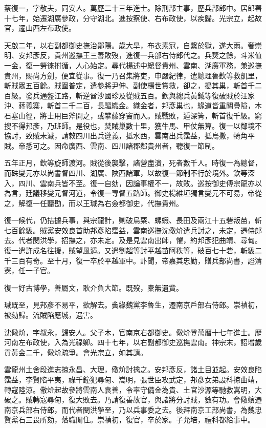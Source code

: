 \begin{pinyinscope}
{{蔡復一，字敬夫，同安人。萬歷二十三年進士。除刑部主事，歷兵部郎中。居郎署十七年，始遷湖廣參政，分守湖北。進按察使、右布政使，以疾歸。光宗立，起故官，遷山西左布政使。

天啟二年，以右副都御史撫治鄖陽。歲大旱，布衣素冠，自繫於獄，遂大雨。奢崇明、安邦彥反，貴州巡撫王三善敗歿，進復一兵部右侍郎代之。兵燹之餘，斗米值一金，復一勞徠拊循，人心始定。尋代楊述中總督貴州、雲南、湖廣軍務，兼巡撫貴州，賜尚方劍，便宜從事。復一乃召集將吏，申嚴紀律，遣總理魯欽等救凱里，斬賊眾五百餘。賊圍普定，遣參將尹伸、副使楊世賞救，卻之，搗其巢，斬首千二百級。發兵通盤江路，斬逆酋沙國珍及從賊五百。欽與總兵黃鉞等復破賊於汪家沖、蔣義寨，斬首二千二百，長驅織金。織金者，邦彥巢也，緣道皆重關疊隘，木石塞山徑，將士用巨斧開之，或攀藤穿竇而入。賊戰敗，遁深箐，斬首復千級。窮搜不得邦彥，乃班師。是役也，焚賊巢數十里，獲牛馬、甲仗無算。復一以鄰境不協討，致賊未滅，請敕四川出兵遵義，抵水西，雲南出兵霑益，抵烏撒，犄角平賊。帝悉可之。因命廣西、雲南、四川諸郡鄰貴州者，聽復一節制。

五年正月，欽等旋師渡河。賊從後襲擊，諸營盡潰，死者數千人。時復一為總督，而硃燮元亦以尚書督四川、湖廣、陜西諸軍，以故復一節制不行於境外。欽等深入，四川、雲南兵皆不至。復一自劾，因論事權不一，故敗。巡按御史傅宗龍亦以為言，廷議移燮元督河道，令復一專督五路師。御史楊維垣獨言燮元不可易，帝從之，解復一任聽勘，而以王瑊為右僉都御史，代撫貴州。

復一候代，仍拮據兵事，與宗龍計，剿破烏粟、螺蝦、長田及兩江十五砦叛苗，斬七百餘級。賊黨安效良首助邦彥陷霑益，雲南巡撫沈儆炌遣兵討之，未定，遷侍郎去。代者閔洪學，招撫之，亦未定。及是見雲南出師，懼，約邦彥犯曲靖、尋甸。復一遣許成名往援，賊望風遁。又遣劉超等討平越苗阿秩等，破百七十砦，斬級二千三百有奇。至十月，復一卒於平越軍中。訃聞，帝嘉其忠勤，贈兵部尚書，謚清憲，任一子官。

復一好古博學，善屬文，耿介負大節。既歿，橐無遺貲。

瑊既至，見邦彥不易平，欲解去。夤緣魏黨李魯生，遷南京戶部右侍郎。崇禎初，被劾歸。流賊陷應城，遇害。

沈儆炌，字叔永，歸安人。父子木，官南京右都御史。儆炌登萬曆十七年進士。歷河南左布政使，入為光祿卿。四十七年，以右副都御史巡撫雲南。神宗末，詔增歲貢黃金二千，儆炌疏爭。會光宗立，如其請。

雲龍州土舍段進志掠永昌、大理，儆炌討擒之。安邦彥反，諸土目並起。安效良陷霑益，李賢陷平夷，祿千鐘犯尋甸、嵩明，張世臣攻武定，邦彥女弟設科掠曲靖，轉寇陸涼。儆炌起故參將雲南人袁善，令率守備金為貴、土官沙源等馳救嵩明，大破之。賊轉寇尋甸，復大敗去。乃請復善故官，與諸將分討賊，數有功。會儆蠙遷南京兵部右侍郎，而代者閔洪學至，乃以兵事委之去。後拜南京工部尚書，為魏忠賢黨石三畏所劾，落職閒住。崇禎初，復官，卒於家。子允培，禮科都給事中。

}}
\end{pinyinscope}
